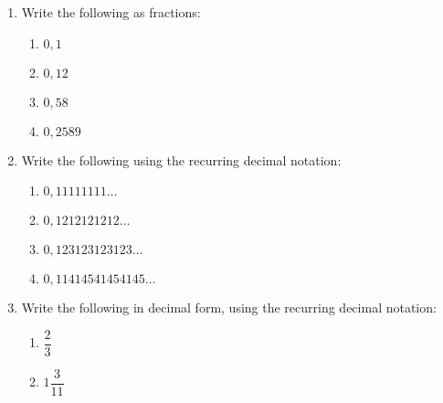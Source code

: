 \begin{exercises}{}
{\begin{enumerate}[itemsep=5pt, label=\textbf{\arabic*}. ]
\begin{enumerate}[itemsep=0pt, label=\textbf{(\alph*)} ]
    \end{enumerate}
% 
\item Write the following as fractions:
    \begin{enumerate}[itemsep=0pt, label=\textbf{(\alph*)} ] 
    \item $0,1$
    \item $0,12$
    \item $0,58$
    \item $0,2589$
    \end{enumerate}
% 
\item Write the following using the recurring decimal notation:
    \begin{enumerate}[itemsep=0pt, label=\textbf{(\alph*)} ] 
    \item $0,11111111\ldots$
    \item $0,1212121212\ldots$
    \item $0,123123123123\ldots$
    \item $0,11414541454145\ldots$
    \end{enumerate}
\item Write the following in decimal form, using the recurring decimal notation:
    \begin{enumerate}[itemsep=5pt, label=\textbf{(\alph*)} ] 
    \item $\dfrac{2}{3}$
    \item $1\dfrac{3}{11}$

\end{enumerate}
\end{enumerate}}
\end{exercises}
